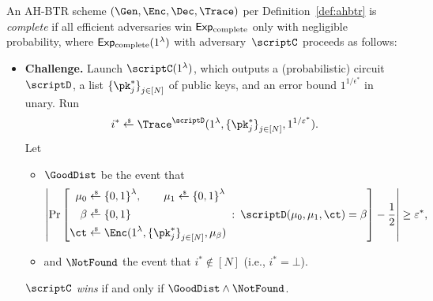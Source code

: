 \begin{definition}[completeness]\label{def:completeness}
An AH-BTR scheme $(\Gen,\Enc,\Dec,\Trace)$ per Definition~\ref{def:ahbtr} is \emph{complete}
if all efficient adversaries win $\ExpComplete$ only with negligible probability,
where $\ExpComplete(1^\lambda)$ with adversary~$\scriptC$ proceeds as follows:
\begin{itemize}\upshape
\item\textbf{Challenge.}
Launch $\scriptC(1^\lambda)$,
which outputs a (probabilistic) circuit~$\scriptD$,
a list $\{\pk_j^\ast\}_{j\in[N]}^\sphantom$ of public keys, and
an error bound $1^{1/\epsilon^\ast}$ in unary.
Run
\begin{align*}
i^\ast\draws\Trace^\scriptD(1^\lambda,\{\pk^\ast_j\}_{j\in[N]}^\sphantom,1^{1/\epsilon^\ast}).
\end{align*}
Let
\begin{itemize}
\item $\GoodDist$ be the event that
\begin{align*}
\left|\Pr\left[
\begin{aligned}
\mu_0&{}\draws\bit^\lambda,\qquad
\mu_1\draws\bit^\lambda\\
\beta&{}\draws\bit\\
\ct&{}\draws\Enc(1^\lambda,\{\pk^\ast_j\}_{j\in[N]}^\sphantom,\mu_\beta)
\end{aligned}
\::\:
\scriptD(\mu_0,\mu_1,\ct)=\beta
\right]-\frac12
\right|
\geq\epsilon^\ast,
\end{align*}
\item and
$\NotFound$ the event that ${i^\ast\notin[N]}$ (i.e., ${i^\ast=\bot}$).
\end{itemize}
$\scriptC$ \emph{wins} if and only if ${\GoodDist\wedge\NotFound}$.
\end{itemize}
\end{definition}
